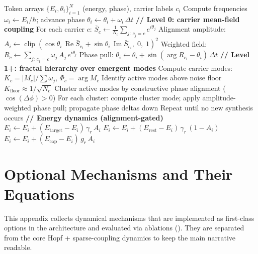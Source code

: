 \documentclass[11pt,a4paper]{article}
\newcommand{\dt}{\Delta t}
\begin{document}
\begin{algorithm}[H]
\caption{Wave-Domain Step (Amplitude-Coupled Mean-Field + Hierarchical Mode Coarse-Graining)}
\label{alg:unified_step}
\begin{algorithmic}[1]
\Require Token arrays $\{E_i,\theta_i\}_{i=1}^N$ (energy, phase), carrier labels $c_i$
\State Compute frequencies $\omega_i \leftarrow E_i/\hbar$; advance phase $\theta_i \leftarrow \theta_i + \omega_i\,\dt$
\State \textbf{// Level 0: carrier mean-field coupling}
\State For each carrier $c$: $\bar{S}_c \leftarrow \frac{1}{N_c}\sum_{j:\,c_j=c} e^{i\theta_j}$ 
\State Alignment amplitude: $A_i \leftarrow \operatorname{clip}(\cos\theta_i\,\operatorname{Re}\bar{S}_{c_i} + \sin\theta_i\,\operatorname{Im}\bar{S}_{c_i},\;0,\;1)^2$
\State Weighted field: $R_c \leftarrow \sum_{j:\,c_j=c} \omega_j\,A_j\,e^{i\theta_j}$ 
\State Phase pull: $\theta_i \leftarrow \theta_i + \sin(\arg R_{c_i} - \theta_i)\,\dt$ 
\State \textbf{// Level 1+: fractal hierarchy over emergent modes}
\State Compute carrier modes: $K_c = |M_c|/\sum \omega_j$, $\Phi_c = \arg M_c$
\State Identify active modes above noise floor $K_{\mathrm{floor}} \approx 1/\sqrt{N_c}$
\State Cluster active modes by constructive phase alignment ($\cos(\Delta\phi)>0$)
\State For each cluster: compute cluster mode; apply amplitude-weighted phase pull; propagate phase deltas down
\State Repeat until no new synthesis occurs
\State \textbf{// Energy dynamics (alignment-gated)}
\State $E_i \leftarrow E_i + (E_{\mathrm{target}} - E_i)\,\gamma_r\,A_i$ 
\State $E_i \leftarrow E_i + (E_{\mathrm{rest}} - E_i)\,\gamma_r\,(1-A_i)$ 
\State $E_i \leftarrow E_i + (E_{\mathrm{cap}} - E_i)\,g_r\,A_i$ 
\end{algorithmic}
\end{algorithm}





\section{Optional Mechanisms and Their Equations}
\label{app:optional}

This appendix collects dynamical mechanisms that are implemented as first-class options in the architecture and evaluated via ablations (). They are separated from the core Hopf + sparse-coupling dynamics to keep the main narrative readable.
\end{document}
